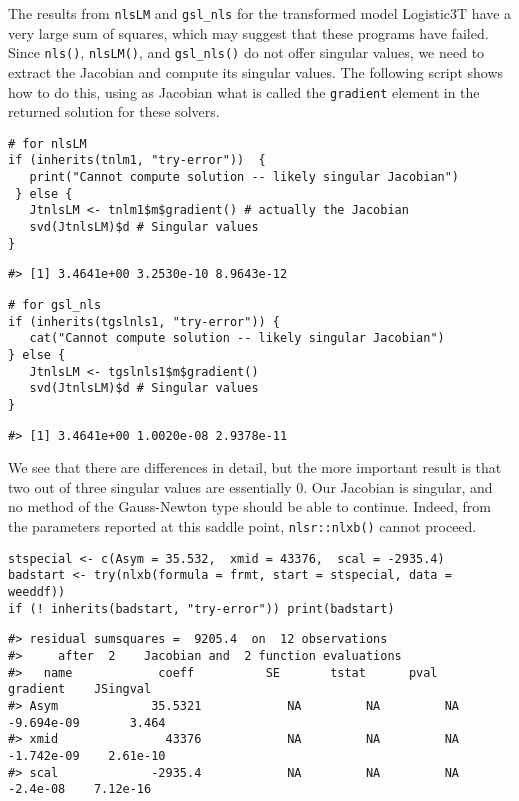 The results from \texttt{nlsLM} and \texttt{gsl\_nls} for the transformed model Logistic3T have a very
large sum of squares, which may suggest that these programs have failed.
Since \texttt{nls()}, \texttt{nlsLM()}, and \texttt{gsl\_nls()} do not
offer singular values, we need to extract the Jacobian and compute its
singular values. The following script shows how to do this, using as Jacobian what is called
the \texttt{gradient} element in the returned solution for these solvers.

\begin{verbatim}
# for nlsLM
if (inherits(tnlm1, "try-error"))  {
   print("Cannot compute solution -- likely singular Jacobian")
 } else {  
   JtnlsLM <- tnlm1$m$gradient() # actually the Jacobian
   svd(JtnlsLM)$d # Singular values
}   
\end{verbatim}

\begin{verbatim}
#> [1] 3.4641e+00 3.2530e-10 8.9643e-12
\end{verbatim}

\begin{verbatim}
# for gsl_nls
if (inherits(tgslnls1, "try-error")) {
   cat("Cannot compute solution -- likely singular Jacobian")
} else {  
   JtnlsLM <- tgslnls1$m$gradient()
   svd(JtnlsLM)$d # Singular values
}   
\end{verbatim}

\begin{verbatim}
#> [1] 3.4641e+00 1.0020e-08 2.9378e-11
\end{verbatim}

We see that there are differences in detail, but the more important result is that
two out of three singular values are essentially 0. Our Jacobian is singular, and no
method of the Gauss-Newton type should be able to continue. Indeed, from the parameters
reported at this saddle point, \texttt{nlsr::nlxb()} cannot proceed.

\begin{verbatim}
stspecial <- c(Asym = 35.532,  xmid = 43376,  scal = -2935.4)
badstart <- try(nlxb(formula = frmt, start = stspecial, data = weeddf))
if (! inherits(badstart, "try-error")) print(badstart)
\end{verbatim}

\begin{verbatim}
#> residual sumsquares =  9205.4  on  12 observations
#>     after  2    Jacobian and  2 function evaluations
#>   name            coeff          SE       tstat      pval      gradient    JSingval   
#> Asym             35.5321            NA         NA         NA  -9.694e-09       3.464  
#> xmid               43376            NA         NA         NA  -1.742e-09    2.61e-10  
#> scal             -2935.4            NA         NA         NA    -2.4e-08    7.12e-16
\end{verbatim}

